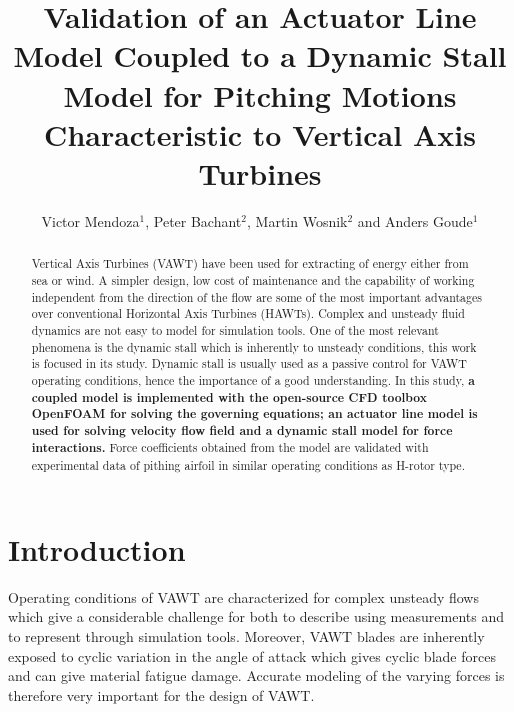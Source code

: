 \documentclass[a4paper]{jpconf}
\begin{document}
\title{Validation of an Actuator Line Model Coupled to a Dynamic Stall Model for
Pitching Motions Characteristic to Vertical Axis Turbines}

\author{Victor Mendoza$^{1}$, Peter Bachant$^{2}$, Martin Wosnik$^{2}$ and Anders Goude$^{1}$ }
\address{$^{1}$ Department of Engineering Sciences, Division of Electricity, Uppsala University, \\Uppsala 751 21, Sweden}
\address{$^{2}$ Center for Ocean Renewable Energy, University of New Hampshire, 24 Colovos Rd.,\\ Durham, NH 03824, USA}


\begin{abstract}

    Vertical Axis Turbines (VAWT) have been used for extracting of energy either
    from sea or wind. A simpler design, low cost of maintenance and the
    capability of working independent from the direction of the flow are some of
    the most important advantages over conventional Horizontal Axis Turbines
    (HAWTs). Complex and unsteady fluid dynamics are not easy to model for
    simulation tools. One of the most relevant phenomena is the dynamic stall
    which is inherently to unsteady conditions, this work is focused in its
    study. Dynamic stall is usually used as a passive control for VAWT operating
    conditions, hence the importance of a good understanding. In this study,
    \textbf{a coupled model is implemented with the open-source CFD toolbox
    OpenFOAM for solving the governing equations; an actuator line model is used
    for solving velocity flow field and a dynamic stall model for force
    interactions.} Force coefficients obtained from the model are validated with
    experimental data of pithing airfoil in similar operating conditions as
    H-rotor type.

\end{abstract}


\section{Introduction}

Operating conditions of VAWT are characterized for complex unsteady flows which
give a considerable challenge for both to describe using measurements and to
represent through simulation tools\cite{huyer1996unsteady}. Moreover, VAWT
blades are inherently exposed to cyclic variation in the angle of attack which
gives cyclic blade forces and can give material fatigue damage. Accurate
modeling of the varying forces is therefore very important for the design of
VAWT.
\end{document}
